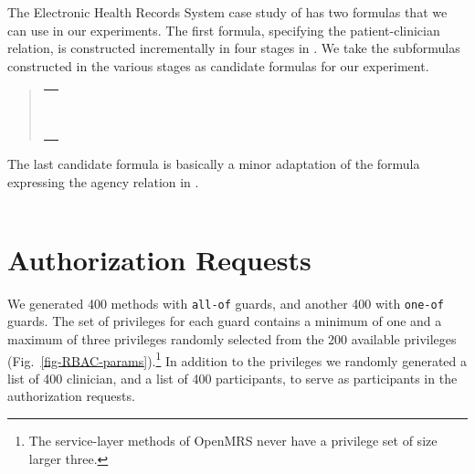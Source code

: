 \documentclass{acm_proc_article-sp}
\newcommand{\textcode}[1]{\texttt{#1}}
\begin{document}
The Electronic Health Records System case study of \cite[\S
5]{Fong:2011} has two formulas that we can use in our experiments.
The first formula, specifying the patient-clinician relation, is
constructed incrementally in four stages in \cite[\S 5.1]{Fong:2011}.
We take the subformulas constructed in the various stages as candidate
formulas for our experiment.
\begin{quote}
\begin{tabular}{l} 
 \\
\\
 \\
\\
\\
  \multicolumn{1}{r}{
  } \\
 \\
\\
\\
\multicolumn{1}{r}{
  }\\
 
\end{tabular}
\end{quote}
\begin{comment}

\end{comment}
The last candidate formula is basically a minor adaptation of the
formula expressing the agency relation in \cite[\S 5.2]{Fong:2011}.
\begin{quote}
\begin{tabular}{l}

\end{tabular}
\end{quote}
\begin{comment}

\end{comment}


\section{Authorization Requests}
\label{app-requests}

We generated 400 methods with \textcode{all-of} guards, and another
400 with \textcode{one-of} guards.  The set  of privileges for each
guard contains a minimum of one and a maximum of three privileges 
randomly selected from the 200 available privileges 
(Fig.~\ref{fig-RBAC-params}).\footnote{The service-layer methods of 
OpenMRS never have a privilege set of size larger three.} In addition
to the privileges we randomly generated a list of 400 clinician, and
a list of 400 participants, to serve as participants in the
authorization requests.
\end{document}
